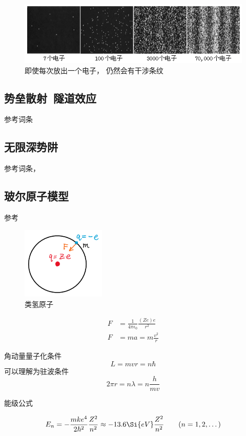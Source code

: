 \begin{figure}[ht]
\centering
\includegraphics[width=12cm]{./figures/QMIntr3.png}
\caption{即使每次放出一个电子， 仍然会有干涉条纹} \label{QMIntr_fig3}
\end{figure}


\subsection{势垒散射\ 隧道效应}
参考词条

\subsection{无限深势阱}
参考词条， 

\subsection{玻尔原子模型}

参考

\begin{figure}[ht]
\centering
\includegraphics[width=4cm]{./figures/QMIntr1.png}
\caption{类氢原子} \label{QMIntr_fig1}
\end{figure}

\begin{equation}
\begin{aligned}
F &= \frac{1}{4\pi \epsilon_0} \frac{(Ze)e}{r^2}
\\
F &= ma = m\frac{v^2}{r}
\end{aligned}
\end{equation}

角动量量子化条件
\begin{equation}
L = mvr = n\hbar
\end{equation}
可以理解为驻波条件
\begin{equation}
2\pi r = n \lambda = n \frac{h}{mv}
\end{equation}

能级公式

\begin{equation}
E_n =  - \frac{m k e^4}{2 \hbar ^2} \frac{Z^2}{n^2} \approx - 13.6\Si{eV} \frac{Z^2}{n^2}
\qquad (n = 1, 2, \dots)
\end{equation}

